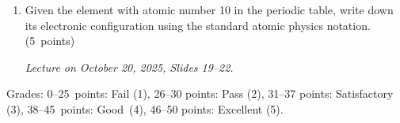 \documentclass[a4paper,12pt]{letter}
\begin{document}
\begin{enumerate}[label=\Roman*.]
\begin{enumerate}[label=\arabic*.]
\smallskip
\textit{Lecture on October 20, 2025, Slide 17.}

\item Given the element with atomic number 10 in the periodic table, write down its electronic configuration using the standard atomic physics notation. \hfill (5~points)

\smallskip
\textit{Lecture on October 20, 2025, Slides 19--22.}
  
\end{enumerate}

\end{enumerate}


Grades: 0–25~points: Fail (1), 26–30 points: Pass (2), 31–37 points: Satisfactory (3), 38–45~points: Good~(4), 46–50 points: Excellent (5).


\vfill
\end{document}
